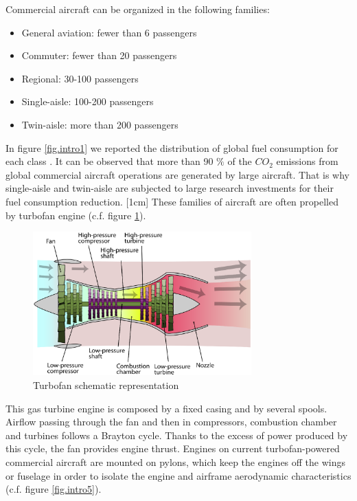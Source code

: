 Commercial aircraft can be organized in the following families:
\begin{itemize}
\item General aviation: fewer than 6 passengers
\item Commuter: fewer than 20 passengers
\item Regional: 30-100 passengers
\item Single-aisle: 100-200 passengers 
\item Twin-aisle: more than 200 passengers
\end{itemize}
In figure \ref{fig.intro1} we reported the distribution of global fuel consumption for each class \cite{yutko2011approaches}. It can be observed that more than 90 $\%$ of the $CO_2$ emissions from global commercial aircraft operations are generated by large aircraft. 
That is why single-aisle and twin-aisle are subjected to large research investments for their fuel consumption reduction.
[1cm]
These families of aircraft are often propelled by turbofan engine (c.f. figure \ref{fig.intro2}).
\begin{figure}[!ht]
\centering   
 \includegraphics[width=0.75\textwidth]{images/intro/Turbofan_operation}
     \caption{Turbofan schematic representation}
     \label{fig.intro2}
\end{figure}
This gas turbine engine is composed by a fixed casing and by several spools. Airflow passing through the fan and then in compressors, combustion chamber and turbines follows a Brayton cycle. Thanks to the excess of power produced by this cycle, the fan provides engine thrust. 
Engines on current turbofan-powered commercial aircraft are mounted on pylons, which keep the engines off the wings or fuselage in order to isolate the engine and airframe aerodynamic characteristics (c.f. figure \ref{fig.intro5}).

